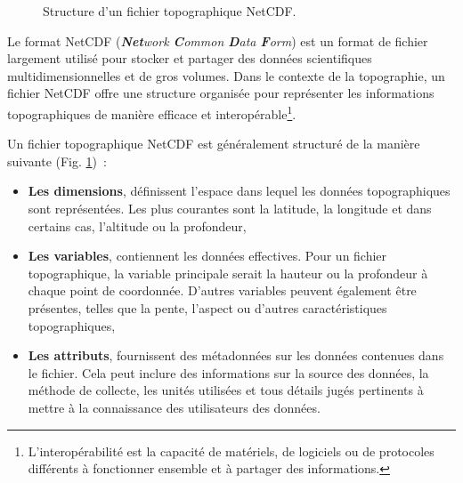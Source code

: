 {\begin{figure}[h]
    \caption{Structure d'un fichier topographique NetCDF.}
    \label{fig:netcdf_structure}
\end{figure}

Le format NetCDF (\textit{\textbf{Net}work \textbf{C}ommon \textbf{D}ata \textbf{F}orm}) est un format de fichier largement utilisé pour stocker et partager des données scientifiques multidimensionnelles et de gros volumes. Dans le contexte de la topographie, un fichier NetCDF offre une structure organisée pour représenter les informations topographiques de manière efficace et interopérable\footnote{L'interopérabilité est la capacité de matériels, de logiciels ou de protocoles différents à fonctionner ensemble et à partager des informations.}.

Un fichier topographique NetCDF est généralement structuré de la manière suivante (Fig. \ref{fig:netcdf_structure})~:
\vspace*{0.5cm}

\begin{itemize}
	\item \textbf{Les dimensions}, définissent l'espace dans lequel les données topographiques sont représentées. Les plus courantes sont la latitude, la longitude et dans certains cas, l'altitude ou la profondeur,

	\item \textbf{Les variables}, contiennent les données effectives. Pour un fichier topographique, la variable principale serait la hauteur ou la profondeur à chaque point de coordonnée. D'autres variables peuvent également être présentes, telles que la pente, l'aspect ou d'autres caractéristiques topographiques,

	\item \textbf{Les attributs}, fournissent des métadonnées sur les données contenues dans le fichier. Cela peut inclure des informations sur la source des données, la méthode de collecte, les unités utilisées et tous détails jugés pertinents à mettre à la connaissance des utilisateurs des données.
\end{itemize}

}
